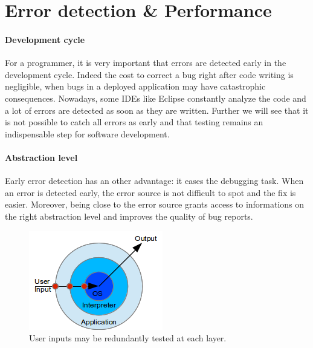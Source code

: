 \documentclass[a4paper]{report}
\begin{document}
\section{Error detection \& Performance}

\paragraph{Development cycle} For a programmer, it is very important that errors are detected early in the development cycle. Indeed the cost to correct a bug right after code writing is negligible, when bugs in a deployed application may have catastrophic consequences. Nowadays, some IDEs like Eclipse constantly analyze the code and a lot of errors are detected as soon as they are written. Further we will see that it is not possible to catch all errors as early and that testing remains an indispensable step for software development.

\paragraph{Abstraction level} Early error detection has an other advantage: it eases the debugging task. When an error is detected early, the error source is not difficult to spot and the fix is easier. Moreover, being close to the error source grants access to informations on the right abstraction level and improves the quality of bug reports.

\begin{figure}
\centering
\includegraphics{images/layer.png}
\caption{User inputs may be redundantly tested at each layer.}
\label{layer}
\end{figure}
\end{document}
